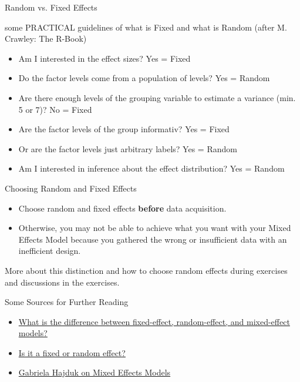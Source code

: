 \documentclass{beamer}
\begin{document}
\begin{frame}{Random vs. Fixed Effects}

some PRACTICAL guidelines of what is Fixed and what is Random (after M. Crawley: The R-Book)

  \begin{itemize}
    \item Am I interested in the effect sizes? Yes = Fixed
    \item Do the factor levels come from a population of levels? Yes = Random
    \item Are there enough levels of the grouping variable to estimate a variance (min. 5 or 7)? No = Fixed
    \item Are the factor levels of the group informativ? Yes = Fixed 
    \item Or are the factor levels just arbitrary labels? Yes = Random
    \item Am I interested in inference about the effect distribution? Yes = Random 
    
  \end{itemize}
\end{frame}


\begin{frame}{Choosing Random and Fixed Effects}
  \begin{itemize}
    \item Choose random and fixed effects \textbf{before} data acquisition.
    \item Otherwise, you may not be able to achieve what you want with your Mixed Effects Model because you gathered the wrong or insufficient data with an inefficient design.
  \end{itemize}

  More about this distinction and how to choose random effects during exercises and discussions in the exercises.
  
\end{frame}

\begin{frame}{Some Sources for Further Reading}
  \begin{itemize}
    \item \href{https://stats.stackexchange.com/questions/4700/what-is-the-difference-between-fixed-effect-random-effect-and-mixed-effect-mode/4702#4702}{What is the difference between fixed-effect, random-effect, and mixed-effect models?}
    \item \href{https://dynamicecology.wordpress.com/2015/11/04/is-it-a-fixed-or-random-effect/}{Is it a fixed or random effect?}
    \item \href{https://gkhajduk.github.io/2017-03-09-mixed-models/}{Gabriela Hajduk on Mixed Effects Models}
  \end{itemize}
\end{frame}
\end{document}
